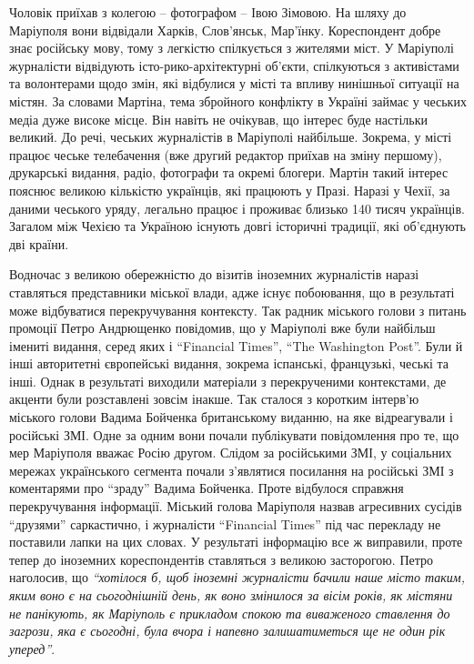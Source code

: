 Чоловік приїхав з колегою – фотографом – Івою Зімовою. На шляху до Маріуполя
вони відвідали Харків, Слов'янськ, Мар'їнку. Кореспондент добре знає російську
мову, тому з легкістю спілкується з жителями міст. У Маріуполі журналісти
відвідують істо\hyp{}рико-архітектурні об'єкти, спілкуються з активістами та
волонтерами щодо змін, які відбулися у місті та впливу нинішньої ситуації на
містян. За словами Мартіна, тема збройного конфлікту в Україні займає у чеських
медіа дуже високе місце. Він навіть не очікував, що інтерес буде настільки
великий. До речі, чеських журналістів в Маріуполі найбільше. Зокрема, у місті
працює чеське телебачення (вже другий редактор приїхав на зміну першому),
друкарські видання, радіо, фотографи та окремі блогери. Мартін такий інтерес
пояснює великою кількістю українців, які працюють у Празі. Наразі у Чехії, за
даними чеського уряду, легально працює і проживає близько 140 тисяч українців.
Загалом між Чехією та Україною існують довгі історичні традиції, які об'єднують
дві країни.


Водночас з великою обережністю до візитів іноземних журналістів наразі
ставляться представники міської влади, адже існує побоювання, що в результаті
може відбуватися перекручування контексту. Так радник міського голови з питань
промоції Петро Андрющенко повідомив, що у Маріуполі вже були найбільш імениті
видання, серед яких і \enquote{Financial Times}, \enquote{The Washington Post}. Були й інші
авторитетні європейські видання, зокрема іспанські, французькі, чеські та інші.
Однак в результаті виходили матеріали з перекрученими контекстами, де акценти
були розставлені зовсім інакше. Так сталося з коротким інтерв'ю міського голови
Вадима Бойченка британському виданню, на яке відреагували і російські ЗМІ. Одне
за одним вони почали публікувати повідомлення про те, що мер Маріуполя вважає
Росію другом. Слідом за російськими ЗМІ, у соціальних мережах українського
сегмента почали з'являтися посилання на російські ЗМІ з коментарями про \enquote{зраду}
Вадима Бойченка. Проте відбулося справжня перекручування інформації. Міський
голова Маріуполя назвав агресивних сусідів \enquote{друзями} саркастично, і журналісти
\enquote{Financial Times} під час перекладу не поставили лапки на цих словах. У
результаті інформацію все ж виправили, проте тепер до іноземних кореспондентів
ставляться з великою засторогою. Петро наголосив, що \emph{\enquote{хотілося б, щоб іноземні
журналісти бачили наше місто таким, яким воно є на сьогоднішній день, як воно
змінилося за вісім років, як містяни не панікують, як Маріуполь є прикладом
спокою та виваженого ставлення до загрози, яка є сьогодні, була вчора і напевно
залишатиметься ще не один рік уперед}}.

